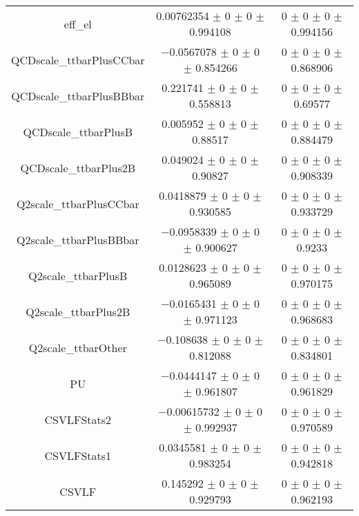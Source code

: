\begin{table}
\begin{tabular}{ccc}
eff\_el 	& \num{0.00762354} $\pm$ \num{0} $\pm$ \num{0} $\pm$ \num{0.994108} 	& \num{0} $\pm$ \num{0} $\pm$ \num{0} $\pm$ \num{0.994156}\\
QCDscale\_ttbarPlusCCbar 	& \num{-0.0567078} $\pm$ \num{0} $\pm$ \num{0} $\pm$ \num{0.854266} 	& \num{0} $\pm$ \num{0} $\pm$ \num{0} $\pm$ \num{0.868906}\\
QCDscale\_ttbarPlusBBbar 	& \num{0.221741} $\pm$ \num{0} $\pm$ \num{0} $\pm$ \num{0.558813} 	& \num{0} $\pm$ \num{0} $\pm$ \num{0} $\pm$ \num{0.69577}\\
QCDscale\_ttbarPlusB 	& \num{0.005952} $\pm$ \num{0} $\pm$ \num{0} $\pm$ \num{0.88517} 	& \num{0} $\pm$ \num{0} $\pm$ \num{0} $\pm$ \num{0.884479}\\
QCDscale\_ttbarPlus2B 	& \num{0.049024} $\pm$ \num{0} $\pm$ \num{0} $\pm$ \num{0.90827} 	& \num{0} $\pm$ \num{0} $\pm$ \num{0} $\pm$ \num{0.908339}\\
Q2scale\_ttbarPlusCCbar 	& \num{0.0418879} $\pm$ \num{0} $\pm$ \num{0} $\pm$ \num{0.930585} 	& \num{0} $\pm$ \num{0} $\pm$ \num{0} $\pm$ \num{0.933729}\\
Q2scale\_ttbarPlusBBbar 	& \num{-0.0958339} $\pm$ \num{0} $\pm$ \num{0} $\pm$ \num{0.900627} 	& \num{0} $\pm$ \num{0} $\pm$ \num{0} $\pm$ \num{0.9233}\\
Q2scale\_ttbarPlusB 	& \num{0.0128623} $\pm$ \num{0} $\pm$ \num{0} $\pm$ \num{0.965089} 	& \num{0} $\pm$ \num{0} $\pm$ \num{0} $\pm$ \num{0.970175}\\
Q2scale\_ttbarPlus2B 	& \num{-0.0165431} $\pm$ \num{0} $\pm$ \num{0} $\pm$ \num{0.971123} 	& \num{0} $\pm$ \num{0} $\pm$ \num{0} $\pm$ \num{0.968683}\\
Q2scale\_ttbarOther 	& \num{-0.108638} $\pm$ \num{0} $\pm$ \num{0} $\pm$ \num{0.812088} 	& \num{0} $\pm$ \num{0} $\pm$ \num{0} $\pm$ \num{0.834801}\\
PU 	& \num{-0.0444147} $\pm$ \num{0} $\pm$ \num{0} $\pm$ \num{0.961807} 	& \num{0} $\pm$ \num{0} $\pm$ \num{0} $\pm$ \num{0.961829}\\
CSVLFStats2 	& \num{-0.00615732} $\pm$ \num{0} $\pm$ \num{0} $\pm$ \num{0.992937} 	& \num{0} $\pm$ \num{0} $\pm$ \num{0} $\pm$ \num{0.970589}\\
CSVLFStats1 	& \num{0.0345581} $\pm$ \num{0} $\pm$ \num{0} $\pm$ \num{0.983254} 	& \num{0} $\pm$ \num{0} $\pm$ \num{0} $\pm$ \num{0.942818}\\
CSVLF 	& \num{0.145292} $\pm$ \num{0} $\pm$ \num{0} $\pm$ \num{0.929793} 	& \num{0} $\pm$ \num{0} $\pm$ \num{0} $\pm$ \num{0.962193}\\

\end{tabular}
\end{table}
